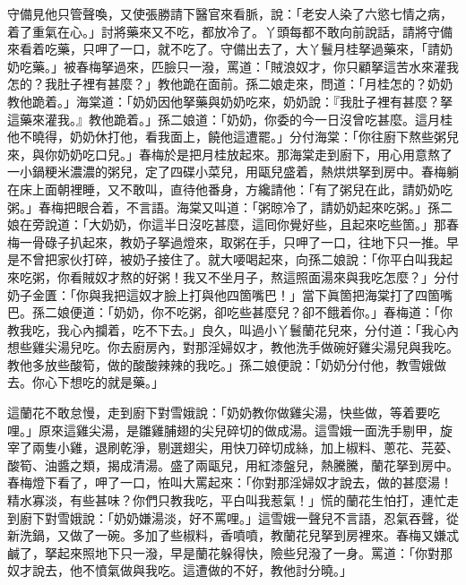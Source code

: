守備見他只管聲喚，又使張勝請下醫官來看脈，說：「老安人染了六慾七情之病，着了重氣在心。」{}討將藥來又不吃，都放冷了。丫頭每都不敢向前說話，請將守備來看着吃藥，只呷了一口，就不吃了。{}守備出去了，大丫鬟月桂拏過藥來，「請奶奶吃藥。」被春梅拏過來，匹臉只一潑，罵道：「賊浪奴才，你只顧拏這苦水來灌我怎的？我肚子裡有甚麼？」教他跪在面前。孫二娘走來，問道：「月桂怎的？奶奶教他跪着。」海棠道：「奶奶因他拏藥與奶奶吃來，奶奶說：『我肚子裡有甚麼？拏這藥來灌我。』教他跪着。」孫二娘道：「奶奶，你委的今一日沒曾吃甚麼。這月桂他不曉得，奶奶休打他，看我面上，饒他這遭罷。」分付海棠：「你往廚下熬些粥兒來，與你奶奶吃口兒。」春梅於是把月桂放起來。那海棠走到廚下，用心用意熬了一小鍋粳米濃濃的粥兒，定了四碟小菜兒，用甌兒盛着，熱烘烘拏到房中。春梅躺在床上面朝裡睡，又不敢叫，直待他番身，方纔請他：「有了粥兒在此，請奶奶吃粥。」春梅把眼合着，不言語。海棠又叫道：「粥晾冷了，請奶奶起來吃粥。」孫二娘在旁說道：「大奶奶，你這半日沒吃甚麼，這囘你覺好些，且起來吃些箇。」那春梅一骨碌子扒起來，教奶子拏過燈來，取粥在手，只呷了一口，往地下只一推。{}早是不曾把家伙打碎，被奶子接住了。就大喓喝起來，向孫二娘說：「你平白叫我起來吃粥，你看賊奴才熬的好粥！我又不坐月子，熬這照面湯來與我吃怎麼？」分付奶子金匱：「你與我把這奴才臉上打與他四箇嘴巴！」當下眞箇把海棠打了四箇嘴巴。孫二娘便道：「奶奶，你不吃粥，卻吃些甚麼兒？卻不餓着你。」春梅道：「你教我吃，我心內攔着，吃不下去。」良久，叫過小丫鬟蘭花兒來，分付道：「我心內想些雞尖湯兒吃。{}你去廚房內，對那淫婦奴才，教他洗手做碗好雞尖湯兒與我吃。教他多放些酸筍，做的酸酸辣辣的我吃。」{}孫二娘便說：「奶奶分付他，教雪娥做去。你心下想吃的就是藥。」

這蘭花不敢怠慢，走到廚下對雪娥說：「奶奶教你做雞尖湯，快些做，等着要吃哩。」{}原來這雞尖湯，是雛雞脯翅的尖兒碎切的做成湯。這雪娥一面洗手剔甲，旋宰了兩隻小雞，退刷乾淨，剔選翅尖，用快刀碎切成絲，加上椒料、蔥花、芫荽、酸筍、油醬之類，揭成清湯。盛了兩甌兒，用紅漆盤兒，熱騰騰，蘭花拏到房中。春梅燈下看了，呷了一口，恠叫大罵起來：「你對那淫婦奴才說去，做的甚麼湯！精水寡淡，有些甚味？你們只教我吃，平白叫我惹氣！」慌的蘭花生怕打，連忙走到廚下對雪娥說：「奶奶嫌湯淡，好不罵哩。」這雪娥一聲兒不言語，忍氣吞聲，從新洗鍋，又做了一碗。多加了些椒料，香噴噴，教蘭花兒拏到房裡來。春梅又嫌忒鹹了，拏起來照地下只一潑，早是蘭花躲得快，險些兒潑了一身。罵道：「你對那奴才說去，他不憤氣做與我吃。這遭做的不好，教他討分曉。」{}

